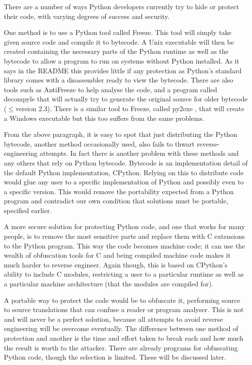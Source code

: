 \documentclass[twoside,a4paper]{report}
\begin{document}
There are a number of ways Python developers currently try to hide or protect their code, with varying degrees
of success and security.

One method is to use a Python tool called Freeze. This tool will simply take given source code and compile
it to bytecode. A Unix executable will then be created containing the necessary parts of the Python runtime as
well as the bytecode to allow a program to run
on systems without Python installed. As it says in the README \cite{freezereadme} this provides little if any
protection as Python's standard library comes with a disassembler ready to view the bytecode. There are also
tools such as AntiFreeze \cite{pirates} to help analyse the code, and a program called
decompyle \cite{decompyle} that will actually try to generate the original source for older bytecode ($\le$version
2.3). There is a similar tool to Freeze, called py2exe \cite{py2exe}, that will create a Windows executable but
this too suffers from the same problems.

From the above paragraph, it is easy to spot that just distributing the Python bytecode, another method occasionally
used, also fails to thwart reverse-engineering attempts. In fact there is another problem
with these methods and any others that rely on Python bytecode. Bytecode is an implementation detail \cite{dis}
of the default Python implementation, CPython. Relying on this to distribute code would glue any
user to a specific implementation of Python and possibly even to a specific version. This would remove the portability
expected from a Python program and contradict our own condition that solutions must be portable, specified earlier.

A more secure solution for protecting Python code, and one that works for many people, is to remove the most
sensitive parts and replace them with C extensions to the Python program. This way the code becomes machine
code; it can use the wealth of obfuscation tools for C and being compiled machine code makes it much
harder to reverse engineer. Again though, this is based on CPython's ability to include C modules, restricting a
user to a particular runtime as well as a particular machine architecture (that the modules are compiled for).

A portable way to protect the code would be to obfuscate it, performing source to source translations that can
confuse a reader or program analyser. This is not and will never be a perfect solution, because all attempts
to avoid reverse engineering will be overcome eventually. The difference between one method of protection and
another is the time and effort taken to break each and how much the result is worth to the attacker. There are already
programs for obfuscating Python code, though the selection is limited. These will be discussed later.
\end{document}
